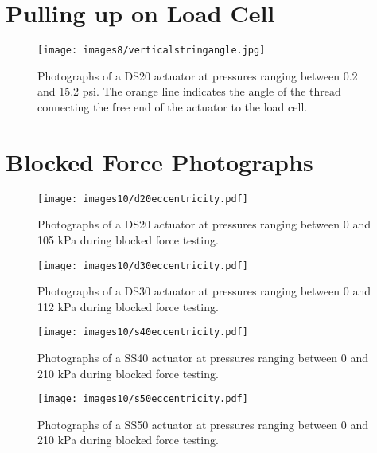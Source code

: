 \chapter{Pulling up on Load Cell}
\label{appendix:pullinguploadcell}

\begin{figure}[ht]
    \centering
     \texttt{[image: images8/verticalstringangle.jpg]}
    \caption{Photographs of a DS20 actuator at pressures ranging between 0.2 and 15.2 psi. The orange line indicates the angle of the thread connecting the free end of the actuator to the load cell.}
    \label{fig:verticalstringangle}
\end{figure}

\chapter{Blocked Force Photographs}
\label{appendix:bf}

\begin{figure}[ht]
    \centering
     \texttt{[image: images10/d20eccentricity.pdf]}
    \caption{Photographs of a DS20 actuator at pressures ranging between 0 and 105 kPa during blocked force testing.}
\end{figure}

\begin{figure}[ht]
    \centering
     \texttt{[image: images10/d30eccentricity.pdf]}
    \caption{Photographs of a DS30 actuator at pressures ranging between 0 and 112 kPa during blocked force testing.}
\end{figure}

\begin{figure}[ht]
    \centering
     \texttt{[image: images10/s40eccentricity.pdf]}
    \caption{Photographs of a SS40 actuator at pressures ranging between 0 and 210 kPa during blocked force testing.}
\end{figure}

\begin{figure}[ht]
    \centering
     \texttt{[image: images10/s50eccentricity.pdf]}
    \caption{Photographs of a SS50 actuator at pressures ranging between 0 and 210 kPa during blocked force testing.}
\end{figure}